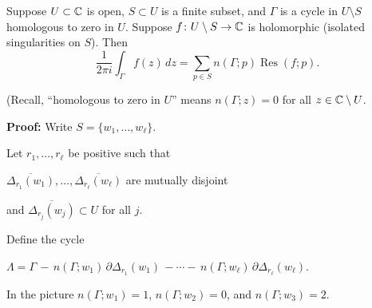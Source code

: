\documentclass[10pt,aspectratio=169]{beamer}
\begin{document}
\begin{frame}

\begin{theorem}
Suppose $U \subset {\mathbb{C}}$ is open, $S \subset U$ is a finite subset,
and $\Gamma$ is
a cycle
in $U \setminus S$
homologous to zero in $U$.
Suppose $f \colon U \setminus S \to {\mathbb{C}}$ is holomorphic (isolated
singularities on $S$).
Then
\begin{equation*}
\frac{1}{2\pi i} \int_{\Gamma} f(z) \, dz = \sum_{p \in S} n(\Gamma;p) \operatorname{Res}(f;p) .
\end{equation*}
\end{theorem}

{\small
(Recall, ``homologous to zero in $U$'' means
$n(\Gamma;z) = 0$ for all $z \in {\mathbb{C}} \setminus U$.}

\medskip

\textbf{Proof:}
Write $S = \{ w_1,\ldots,w_\ell \}$.

\pause
Let $r_1,\ldots,r_\ell$ be positive
such that

$\overline{\Delta_{r_1}(w_1)},\ldots, \overline{\Delta_{r_\ell}(w_\ell)}$
are mutually disjoint
\pause

and
$\overline{\Delta_{r_j}(w_j)} \subset U$ for all $j$.

\pause
\medskip

\vspace*{-1.0in}
\hspace*{2.6in}

\vspace*{-20pt}

Define the cycle

\medskip

$
\Lambda = \Gamma \,
- \, n(\Gamma;w_1) \, \partial \Delta_{r_1} (w_1)
\, -
\cdots
- \, n(\Gamma;w_\ell) \, \partial \Delta_{r_\ell} (w_\ell)$.

\pause
\medskip

In the picture \quad 
$n(\Gamma;w_1) = 1$, $n(\Gamma;w_2)=0$, and
$n(\Gamma;w_3) = 2$.

\end{frame}
\end{document}
